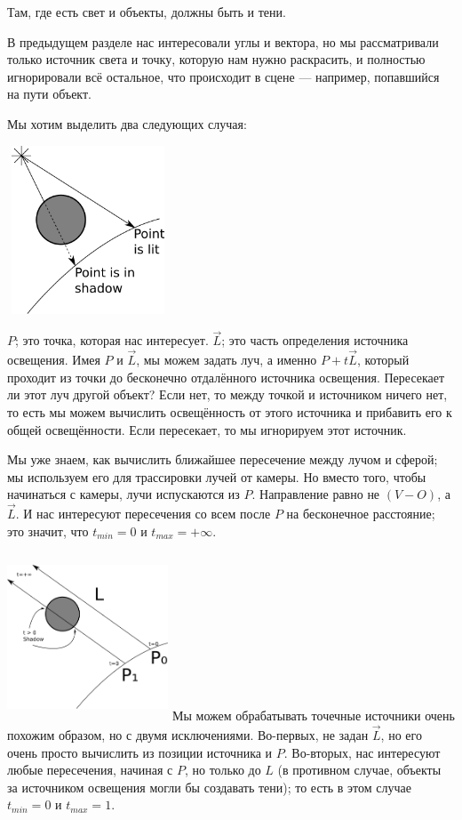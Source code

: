 Там, где есть свет и объекты, должны быть и тени.

В предыдущем разделе нас интересовали углы и вектора, но мы рассматривали только источник света и точку, которую нам нужно раскрасить, и полностью игнорировали всё остальное, что происходит в сцене — например, попавшийся на пути объект.

Мы хотим выделить два следующих случая:

\includegraphics[width=4.8cm, height=5cm]{shadows1.png}

$P$; это точка, которая нас интересует. $\vec{L}$; это часть определения источника освещения. Имея $P$ и $\vec{L}$, мы можем задать луч, а именно $P + t\vec{L}$, который проходит из точки до бесконечно отдалённого источника освещения. Пересекает ли этот луч другой объект? Если нет, то между точкой и источником ничего нет, то есть мы можем вычислить освещённость от этого источника и прибавить его к общей освещённости. Если пересекает, то мы игнорируем этот источник.

Мы уже знаем, как вычислить ближайшее пересечение между лучом и сферой; мы используем его для трассировки лучей от камеры. Но вместо того, чтобы начинаться с камеры, лучи испускаются из $P$. Направление равно не $(V - O)$, а $\vec{L}$. И нас интересуют пересечения со всем после $P$ на бесконечное расстояние; это значит, что $t_{min} = 0$ и $t_{max} = +\infty$.

\includegraphics[width=4.8cm, height=5cm]{shadows2.png}
\newpage
Мы можем обрабатывать точечные источники очень похожим образом, но с двумя исключениями. Во-первых, не задан $\vec{L}$, но его очень просто вычислить из позиции источника и $P$. Во-вторых, нас интересуют любые пересечения, начиная с $P$, но только до $L$ (в противном случае, объекты за источником освещения могли бы создавать тени); то есть в этом случае $t_{min} = 0$ и $t_{max} = 1$.

